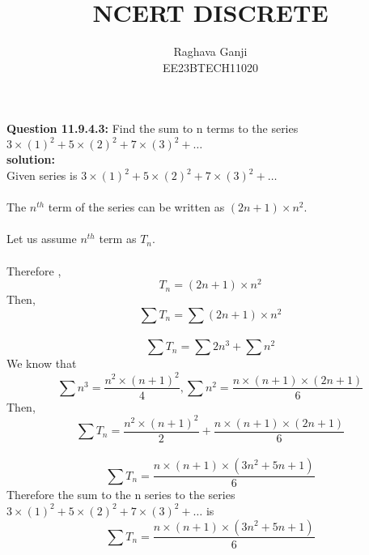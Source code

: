 \documentclass[12pt]{article}
\title{NCERT DISCRETE}
\author{Raghava Ganji\\EE23BTECH11020}
\date{}
\begin{document}
\maketitle
\textbf{Question 11.9.4.3:}
Find the sum to n terms to the series $3\times(1)^2+5\times(2)^2+7\times(3)^2+ \ldots$\\
\textbf{solution:}\\
Given series is $3\times(1)^2+5\times(2)^2+7\times(3)^2+ \ldots$\\\\
The $n^{th}$ term of the series can be written as $(2n+1)\times n^2$.\\\\
Let us assume $n^{th}$ term as $T_n$.\\\\
Therefore ,
\begin{equation}
\tag{1}
T_n=(2n+1)\times n^2
\end{equation}
Then,
\begin{equation}
\tag{2}
\sum T_n=\sum (2n+1)\times n^2
\end{equation}\\
\begin{equation}
\tag{3}
\sum T_n=\sum 2n^3 +\sum n^2
\end{equation}
We know that 
\begin{equation}
\tag{4}
\sum n^3=\frac{n^2\times(n+1)^2}{4}, \sum n^2=\frac{n\times(n+1)\times(2n+1)}{6}
\end{equation}
Then,
\begin{equation}
\tag{5}
\sum T_n=\frac{n^2\times(n+1)^2}{2} +\frac{n\times(n+1)\times(2n+1)}{6}
\end{equation}\\
\begin{equation}
\tag{6}
\sum T_n=\frac{n\times(n+1)\times(3n^2+5n+1)}{6}
\end{equation} 
Therefore the sum to the n series to the series $3\times(1)^2+5\times(2)^2+7\times(3)^2+\ldots$ is 
\begin{equation}
\tag{6}
\sum T_n=\frac{n\times(n+1)\times(3n^2+5n+1)}{6}
\end{equation}
\end{document}
